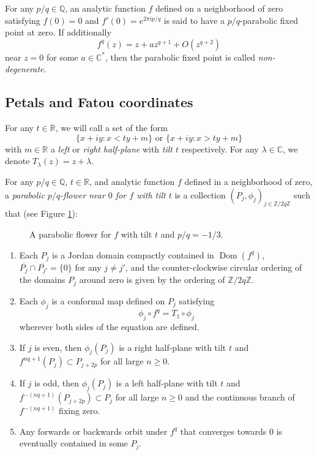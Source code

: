 \documentclass[12pt,letterpaper]{amsart}
\numberwithin{equation}{section}
\theoremstyle{remark}
\theoremstyle{definition}
\newcommand{\C}{\mathbb C}
\newcommand{\Q}{\mathbb Q}
\newcommand{\R}{\mathbb R}
\newcommand{\Z}{\mathbb Z}
\DeclareMathOperator{\Dom}{Dom}
\begin{document}
	
	
	For any  $p/q\in \Q$, an analytic function $f$ defined on a neighborhood of zero satisfying $f(0) = 0$ and $f'(0) = e^{2\pi i p/q}$
	is said to have a $p/q$-parabolic fixed point at zero. If additionally
	$$f^q(z) = z+az^{q+1}+O(z^{q+2})$$
	near $z=0$ for some $a\in \C^*$, then the parabolic fixed point is called \textit{non-degenerate}.
	
	
	
	
\subsection{Petals and Fatou coordinates}

For any $t\in \R$, we will call a set of the form $$\{x+iy: x< ty+m\}\text{ or }\{x+iy: x>ty+m\}$$ with $m\in \R$ a \textit{left} or \textit{right half-plane} with \textit{tilt $t$} respectively.
For any $\lambda\in \C$, we denote $T_\lambda(z) = z+\lambda$.

For any $p/q\in \Q$, $t\in \R$, and analytic function $f$ defined in a neighborhood of zero, a \textit{parabolic $p/q$-flower near $0$ for $f$ with tilt $t$} is a collection $(P_j, \phi_j)_{j\in \Z/2q\Z}$ such that (see Figure \ref{parabolic petals fig}):

	\begin{figure}
	\begin{center}
		\def\svgwidth{6in}
		
		\caption{A parabolic flower for $f$ with tilt $t$ and $p/q=-1/3$.}
		\label{parabolic petals fig}
	\end{center}
\end{figure}
\begin{enumerate}
	\item Each $P_j$ is a Jordan domain compactly contained in $\Dom(f^q)$, $\overline{P_j}\cap \overline{P_{j'}}= \{0\}$ for any $j\neq j'$, and the counter-clockwise circular ordering of the domains $P_j$ around zero is given by the ordering of $\Z/2q\Z$.
	\item Each $\phi_j$ is a conformal map defined on $P_j$  satisfying $$\phi_j\circ f^q = T_1\circ \phi_j$$
	wherever both sides of the equation are defined.
	\item If $j$ is even, then $\phi_j(P_j)$ is a right half-plane with tilt $t$ and
	$f^{nq+1}(P_{j})\subset P_{j+2p}$ for all large $n\geq 0$. 
	\item If $j$ is odd, then $\phi_j(P_j)$ is a left half-plane with tilt $t$ and  
	$f^{-(nq+1)}(P_{j+2p})\subset P_j$ for all large $n\geq 0$ and the continuous branch of $f^{-(nq+1)}$ fixing zero.
	\item Any forwards or backwards orbit under $f^q$ that converges towards $0$ is eventually contained in some $P_j$. 
\end{enumerate}
\end{document}
